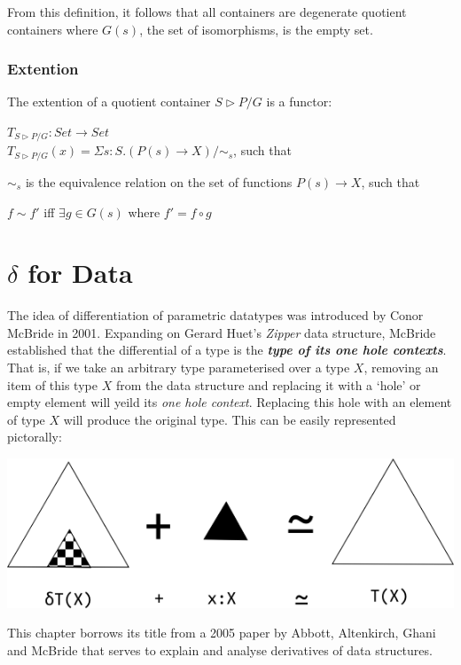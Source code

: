 \documentclass[12pt]{report}
\begin{document}
 From this definition, it follows that all containers are degenerate quotient containers where $G(s)$, the set of isomorphisms, is the empty set. 

\subsection{Extention}
The extention of a quotient container $S \rhd P/G$ is a functor:
\begin{center}
$T_{S \rhd P/G} : Set \rightarrow Set$\\
$T_{S \rhd P/G}(x) = \Sigma s:S.(P(s) \rightarrow X)/\sim_{s}$, such that\\
\end{center}
$\sim_{s}$ is the equivalence relation on the set of functions $P(s) \rightarrow X$, such that
\begin{center}
$f \sim f'$ iff $\exists g \in G(s)$ where $f' = f \circ g$
\end{center}

\chapter{$\delta$ for Data}
The idea of differentiation of parametric datatypes was introduced by Conor McBride in 2001. Expanding on Gerard Huet's \textit{Zipper} data structure\cite{zipper}, McBride established that the differential of a type is the \textbf{\textit{type of its one hole contexts}}. That is, if we take an arbitrary type parameterised over a type $X$, removing an item of this type $X$ from the data structure and replacing it with a `hole' or empty element will yeild its \textit{one hole context}. Replacing this hole with an element of type $X$ will produce the original type. This can be easily represented pictorally:
\begin{center}
\includegraphics[scale=0.6]{5.png}
\end{center} 
This chapter borrows its title from a 2005 paper by Abbott, Altenkirch, Ghani and McBride that serves to explain and analyse derivatives of data structures.
\end{document}
